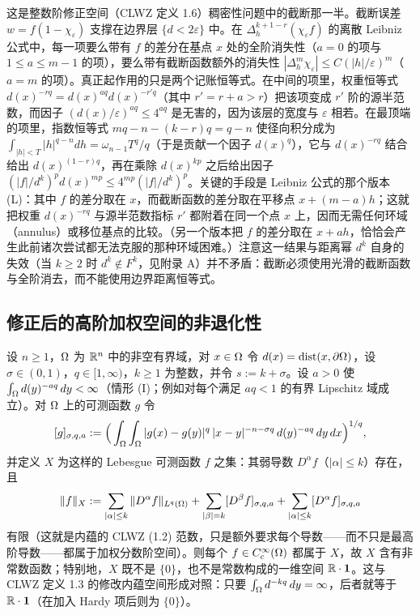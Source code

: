 \begin{remark}[直觉]
这是整数阶修正空间（CLWZ 定义 1.6）稠密性问题中的截断那一半。截断误差 $w = f(1-\chi_\varepsilon)$ 支撑在边界层 $\{d<2\varepsilon\}$ 中。在 $\Delta_h^{k+1-r}(\chi_\varepsilon f)$ 的离散 Leibniz 公式中，每一项要么带有 $f$ 的差分在基点 $x$ 处的全阶消失性（$a = 0$ 的项与 $1 \le a \le m-1$ 的项），要么带有截断函数额外的消失性 $|\Delta_h^m \chi_\varepsilon| \le C(|h|/\varepsilon)^m$（$a = m$ 的项）。真正起作用的只是两个记账恒等式。在中间的项里，权重恒等式 $d(x)^{-rq} = d(x)^{aq} d(x)^{-r'q}$（其中 $r' = r+a > r$）把该项变成 $r'$ 阶的源半范数，而因子 $(d(x)/\varepsilon)^{aq} \le 4^{aq}$ 是无害的，因为该层的宽度与 $\varepsilon$ 相若。在最顶端的项里，指数恒等式 $mq - n - (k-r)q = q-n$ 使径向积分成为 $\int_{|h|<T}|h|^{q-n}dh = \omega_{n-1}T^q/q$（于是贡献一个因子 $d(x)^q$），它与 $d(x)^{-rq}$ 结合给出 $d(x)^{(1-r)q}$，再在乘除 $d(x)^{kp}$ 之后给出因子 $(|f|/d^k)^p d(x)^{mp} \le 4^{mp}(|f|/d^k)^p$。关键的手段是 Leibniz 公式的那个版本 (L)：其中 $f$ 的差分取在 $x$，而截断函数的差分取在平移点 $x+(m-a)h$；这就把权重 $d(x)^{-rq}$ 与源半范数指标 $r'$ 都附着在同一个点 $x$ 上，因而无需任何环域（annulus）或移位基点的比较。（另一个版本把 $f$ 的差分取在 $x+ah$，恰恰会产生此前诸次尝试都无法克服的那种环域困难。）注意这一结果与距离幂 $d^k$ 自身的失效（当 $k \ge 2$ 时 $d^k \notin F^k$，见附录 A）并不矛盾：截断必须使用光滑的截断函数与全阶消去，而不能使用边界距离恒等式。
\end{remark}

\subsection{修正后的高阶加权空间的非退化性}

\begin{theorem}[修正后的高阶加权空间非退化]
设 $n\ge1$，$\Omega$ 为 $\mathbb{R}^n$ 中的非空有界域，对 $x\in\Omega$ 令 $d(x)=\operatorname{dist}(x,\partial\Omega)$，设 $\sigma\in(0,1)$，$q\in[1,\infty)$，$k\ge1$ 为整数，并令 $s:=k+\sigma$。设 $a>0$ 使 $\int_\Omega d(y)^{-aq}\,dy<\infty$（情形 (I)；例如对每个满足 $aq<1$ 的有界 Lipschitz 域成立）。对 $\Omega$ 上的可测函数 $g$ 令
\[
  [g]_{\sigma,q,a}:=\Big(\int_\Omega\int_\Omega |g(x)-g(y)|^q\,|x-y|^{-n-\sigma q}\,d(y)^{-aq}\,dy\,dx\Big)^{1/q},
\]
并定义 $X$ 为这样的 Lebesgue 可测函数 $f$ 之集：其弱导数 $D^\alpha f$（$|\alpha|\le k$）存在，且
\[
  \|f\|_X:=\sum_{|\alpha|\le k}\|D^\alpha f\|_{L^q(\Omega)}
  +\sum_{|\beta|=k}[D^\beta f]_{\sigma,q,a}
  +\sum_{|\alpha|\le k}[D^\alpha f]_{\sigma,q,a}
\]
有限（这就是内蕴的 CLWZ (1.2) 范数，只是额外要求每个导数——而不只是最高阶导数——都属于加权分数阶空间）。则每个 $f\in C_c^\infty(\Omega)$ 都属于 $X$，故 $X$ 含有非常数函数；特别地，$X$ 既不是 $\{0\}$，也不是常数构成的一维空间 $\mathbb{R}\cdot\mathbf{1}$。这与 CLWZ 定义 1.3 的修改内蕴空间形成对照：只要 $\int_\Omega d^{-kq}\,dy=\infty$，后者就等于 $\mathbb{R}\cdot\mathbf{1}$（在加入 Hardy 项后则为 $\{0\}$）。
\end{theorem}

